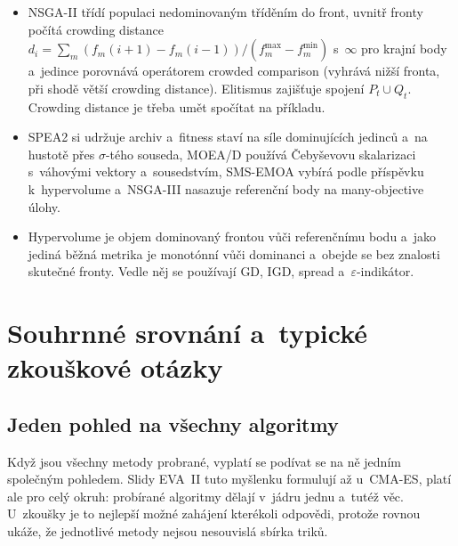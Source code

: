 \documentclass[11pt,a4paper]{article}
\theoremstyle{definition}
\begin{document}
\begin{itemize}
  dále se používá $\varepsilon$-constraint a~Čebyševova skalarizace.
\item NSGA-II třídí populaci nedominovaným tříděním do front, uvnitř fronty počítá
  crowding distance $d_i = \sum_m (f_m(i+1)-f_m(i-1))/(f_m^{\max}-f_m^{\min})$
  s~$\infty$ pro krajní body a~jedince porovnává operátorem crowded comparison (vyhrává
  nižší fronta, při shodě větší crowding distance). Elitismus zajišťuje spojení
  $P_t \cup Q_t$. Crowding distance je třeba umět spočítat na příkladu.
\item SPEA2 si udržuje archiv a~fitness staví na síle dominujících jedinců a~na hustotě
  přes $\sigma$-tého souseda, MOEA/D používá Čebyševovu skalarizaci s~váhovými vektory
  a~sousedstvím, SMS-EMOA vybírá podle příspěvku k~hypervolume a~NSGA-III nasazuje
  referenční body na many-objective úlohy.
\item Hypervolume je objem dominovaný frontou vůči referenčnímu bodu a~jako jediná běžná
  metrika je monotónní vůči dominanci a~obejde se bez znalosti skutečné fronty. Vedle něj
  se používají GD, IGD, spread a~$\varepsilon$-indikátor.
\end{itemize}

\section*{Souhrnné srovnání a~typické zkouškové otázky}
\label{sec:zaver}
\subsection*{Jeden pohled na všechny algoritmy}

Když jsou všechny metody probrané, vyplatí se podívat se na ně jedním společným pohledem. Slidy
EVA~II tuto myšlenku formulují až u~CMA-ES, platí ale pro celý okruh: probírané algoritmy dělají
v~jádru jednu a~tutéž věc. U~zkoušky je to nejlepší možné zahájení kterékoli odpovědi, protože
rovnou ukáže, že jednotlivé metody nejsou nesouvislá sbírka triků.
\end{document}
